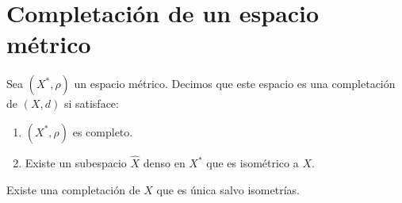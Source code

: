 \section{Completación de un espacio métrico}

\begin{definicion}
Sea $(X^*, \rho)$ un espacio métrico. Decimos que este espacio es una completación de $(X,d)$ si satisface:
\begin{enumerate}
    \item $(X^*, \rho)$ es completo.
    \item Existe un subespacio $\hat{X}$ denso en $X^*$ que es isométrico a $X$.
\end{enumerate}
\end{definicion}

\begin{teorema}
Existe una completación de $X$ que es única salvo isometrías.
\end{teorema}
